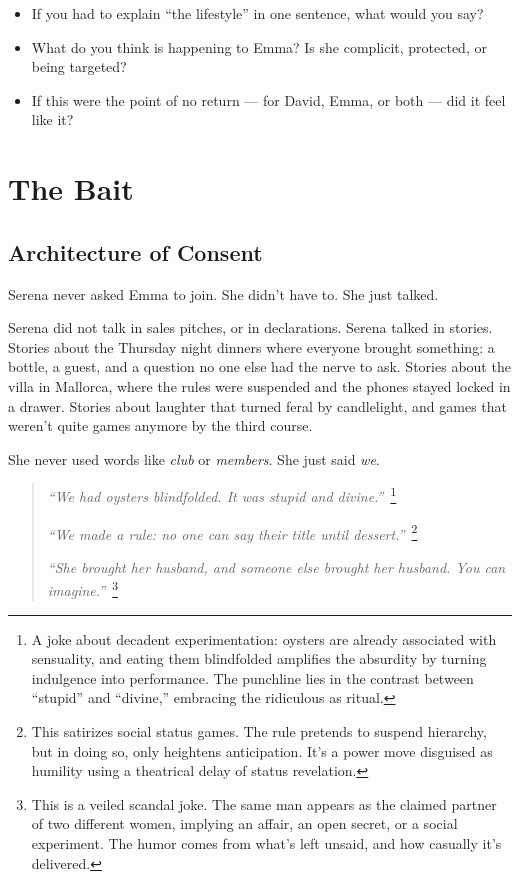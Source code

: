 \begin{itemize}
  \item If you had to explain “the lifestyle” in one sentence, what would you say?
  \item What do you think is happening to Emma? Is she complicit, protected, or being targeted?
  \item If this were the point of no return — for David, Emma, or both — did it feel like it?
\end{itemize}










\section{The Bait}

\subsection{Architecture of Consent}

Serena never asked Emma to join.  
She didn’t have to.
She just talked.

Serena did not talk in sales pitches, or in declarations. Serena talked in stories.  
Stories about the Thursday night dinners where everyone brought something: a bottle, a guest, 
and a question no one else had the nerve to ask.  
Stories about the villa in Mallorca, where the rules were suspended and the phones stayed locked in a drawer.  
Stories about laughter that turned feral by candlelight, and games that weren’t quite games anymore by the third course.

She never used words like \textit{club} or \textit{members}.  
She just said \textit{we}.

\begin{quote}
  \textit{``We had oysters blindfolded. It was stupid and divine.''}\ \footnote{A joke about decadent 
  experimentation: oysters are already associated with sensuality, and eating them blindfolded amplifies 
  the absurdity by turning indulgence into performance. The punchline lies in the contrast between 
  “stupid” and “divine,” embracing the ridiculous as ritual.}

  \textit{``We made a rule: no one can say their title until dessert.''}\ \footnote{This satirizes social status 
  games. The rule pretends to suspend hierarchy, but in doing so, only heightens anticipation. It’s a power 
  move disguised as humility using a theatrical delay of status revelation.}

  \textit{``She brought her husband, and someone else brought her husband. You can imagine.''}\ \footnote{This 
  is a veiled scandal joke. The same man appears as the claimed partner of two different women, implying 
  an affair, an open secret, or a social experiment. The humor comes from what’s left unsaid, and 
  how casually it's delivered.}
\end{quote}

